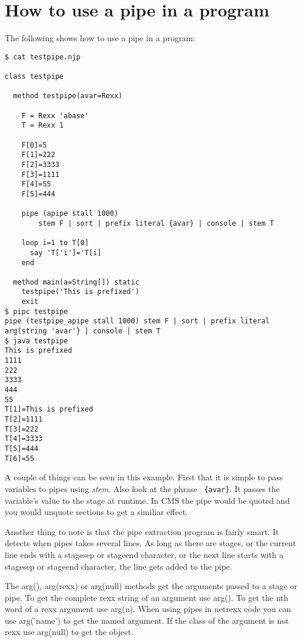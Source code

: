 \section{How to use a pipe in a \nr{} program}

The following shows how to use a pipe in a \nr{} program:

\begin{lstlisting}
$ cat testpipe.njp

class testpipe

  method testpipe(avar=Rexx)

    F = Rexx 'abase'
    T = Rexx 1

    F[0]=5
    F[1]=222
    F[2]=3333
    F[3]=1111
    F[4]=55
    F[5]=444

    pipe (apipe stall 1000)
        stem F | sort | prefix literal {avar} | console | stem T

    loop i=1 to T[0]
      say 'T['i']='T[i]
    end

  method main(a=String[]) static
    testpipe('This is prefixed')
    exit
$ pipc testpipe
pipe (testpipe_apipe stall 1000) stem F | sort | prefix literal arg(string 'avar'} | console | stem T
$ java testpipe
This is prefixed
1111
222
3333
444
55
T[1]=This is prefixed
T[2]=1111
T[3]=222
T[4]=3333
T[5]=444
T[6]=55
\end{lstlisting}

 A couple of things can be seen in this example.  First that it is
 simple to pass \nr{} variables to pipes using \emph{stem}.  Also look
 at the phrase \texttt{ \{avar\}}. It passes the \nr{} variable's value to the stage at runtime.  In CMS the pipe would be quoted and you would unquote sections to get a similiar effect.

 Another thing to note is that the pipe extraction program is fairly smart.
It detects when pipes takes several lines.
As long as there are stages, or the current line ends with a stagesep or stageend character,
or the next line starts with a stagesep or stageend character, the line gets added to the pipe.

 The arg(), arg(rexx) or arg(null) methods get the arguments passed to
     a stage or pipe.  To get the complete rexx string of an argument use
 arg(). To get the nth word of a rexx argument use arg(n).  When using
 pipes in netrexx code you can use arg('name') to get the named
 argument. If the class of the argument is not rexx use arg(null) to
 get the object.
 
